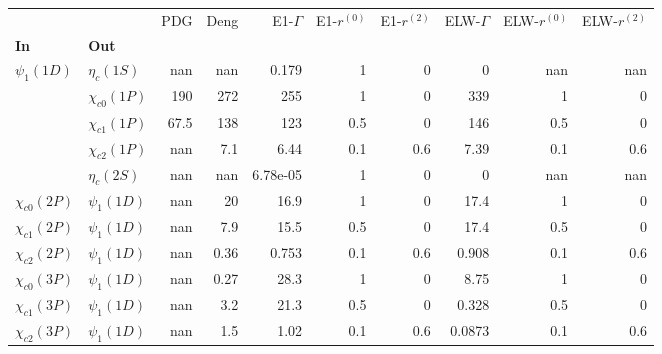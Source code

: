 \begin{tabular}{l|l|r|r|r|r|r|r|r|r}
\toprule
                &                &  PDG &  Deng &  E1-$\Gamma$ &  E1-$r^{(0)}$ &  E1-$r^{(2)}$ &  ELW-$\Gamma$ &  ELW-$r^{(0)}$ &  ELW-$r^{(2)}$ \\
\textbf{In} & \textbf{Out} &      &       &              &               &               &               &                &                \\
\midrule
\textbf{$\psi_{1}(1D)$} & \textbf{$\eta_{c}(1S)$} &  nan &   nan &        0.179 &             1 &             0 &             0 &            nan &            nan \\
                & \textbf{$\chi_{c0}(1P)$} &  190 &   272 &          255 &             1 &             0 &           339 &              1 &              0 \\
                & \textbf{$\chi_{c1}(1P)$} & 67.5 &   138 &          123 &           0.5 &             0 &           146 &            0.5 &              0 \\
                & \textbf{$\chi_{c2}(1P)$} &  nan &   7.1 &         6.44 &           0.1 &           0.6 &          7.39 &            0.1 &            0.6 \\
                & \textbf{$\eta_{c}(2S)$} &  nan &   nan &     6.78e-05 &             1 &             0 &             0 &            nan &            nan \\
\textbf{$\chi_{c0}(2P)$} & \textbf{$\psi_{1}(1D)$} &  nan &    20 &         16.9 &             1 &             0 &          17.4 &              1 &              0 \\
\textbf{$\chi_{c1}(2P)$} & \textbf{$\psi_{1}(1D)$} &  nan &   7.9 &         15.5 &           0.5 &             0 &          17.4 &            0.5 &              0 \\
\textbf{$\chi_{c2}(2P)$} & \textbf{$\psi_{1}(1D)$} &  nan &  0.36 &        0.753 &           0.1 &           0.6 &         0.908 &            0.1 &            0.6 \\
\textbf{$\chi_{c0}(3P)$} & \textbf{$\psi_{1}(1D)$} &  nan &  0.27 &         28.3 &             1 &             0 &          8.75 &              1 &              0 \\
\textbf{$\chi_{c1}(3P)$} & \textbf{$\psi_{1}(1D)$} &  nan &   3.2 &         21.3 &           0.5 &             0 &         0.328 &            0.5 &              0 \\
\textbf{$\chi_{c2}(3P)$} & \textbf{$\psi_{1}(1D)$} &  nan &   1.5 &         1.02 &           0.1 &           0.6 &        0.0873 &            0.1 &            0.6 \\
\bottomrule
\end{tabular}
